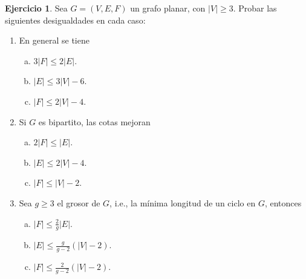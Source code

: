 \documentclass[12pt]{report}
\theoremstyle{plain}
\theoremstyle{definition}
\newtheorem{exercise}[theorem]{Ejercicio}
\newcommand{\abs}[1]{\left \vert #1 \right \vert}
\begin{document}
\begin{exercise}
Sea $G = (V,E,F)$ un grafo planar, con $\abs V \geq 3$. Probar las siguientes desigualdades en cada caso:
\begin{enumerate}
\item En general se tiene
\begin{enumerate}[(a)]
\item $3 \abs F \leq 2 \abs E$.
\item $\abs E \leq 3 \abs V - 6$.
\item $\abs F \leq 2 \abs V - 4$.
\end{enumerate}
\item Si $G$ es bipartito, las cotas mejoran
\begin{enumerate}[(a)]
\item $2 \abs F \leq \abs E$.
\item $\abs E \leq 2 \abs V - 4$.
\item $\abs F \leq \abs V - 2$.
\end{enumerate}
\item Sea $g \geq 3$ el grosor de $G$, i.e., la mínima longitud de un ciclo en $G$, entonces
\begin{enumerate}[(a)]
\item $\abs F \leq \frac 2 g \abs E$.
\item $\abs E \leq \frac g {g-2} (\abs V - 2)$.
\item $\abs F \leq \frac 2 {g-2} ( \abs V -2 )$.
\end{enumerate}
\end{enumerate}
\end{exercise}
\end{document}
